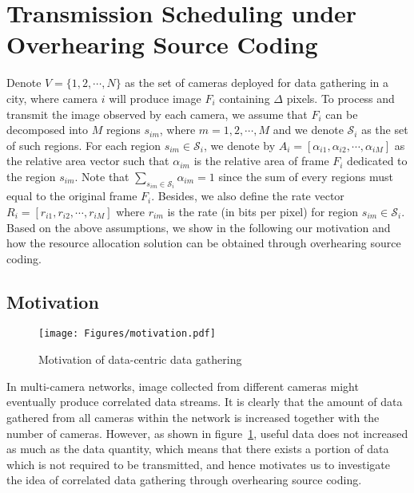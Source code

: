 \section{Transmission Scheduling under Overhearing Source Coding}
\label{sec::OSC}
Denote ${V=\{ 1,2,\cdots,N \}}$ as the set of cameras deployed for data gathering in a city, where camera $i$ will produce image $F_i$ containing $\Delta$ pixels.
To process and transmit the image observed by each camera, we assume that $F_i$ can be decomposed into $M$ regions ${s_{im}}$, where ${m = 1,2,\cdots,M}$ and we denote $\mathcal{S}_i$ as the set of such regions.
For each region ${s_{im} \in \mathcal{S}_i}$, we denote by ${A_i = [\alpha_{i1}, \alpha_{i2}, \cdots, \alpha_{iM}]}$ as the relative area vector such that $\alpha_{im}$ is the relative area of frame $F_i$ dedicated to the region $s_{im}$.
Note that ${\sum_{s_{im} \in \mathcal{S}_i} \alpha_{im} = 1}$ since the sum of every regions must equal to the original frame $F_i$.
Besides, we also define the rate vector ${R_i = [r_{i1}, r_{i2}, \cdots, r_{iM}]}$ where $r_{im}$ is the rate (in bits per pixel) for region $s_{im} \in \mathcal{S}_i$.
Based on the above assumptions, we show in the following our motivation and how the resource allocation solution can be obtained through overhearing source coding.
%
\subsection{Motivation}
\begin{figure}
\begin{center}
\texttt{[image: Figures/motivation.pdf]}
\caption{\label{fig::motivation}Motivation of data-centric data gathering}
\end{center}
\end{figure}
In multi-camera networks, image collected from different cameras might eventually produce correlated data streams.
It is clearly that the amount of data gathered from all cameras within the network is increased together with the number of cameras.
However, as shown in figure~\ref{fig::motivation}, useful data does not increased as much as the data quantity, which means that there exists a portion of data which is not required to be transmitted, and hence motivates us to investigate the idea of correlated data gathering through overhearing source coding.
%
